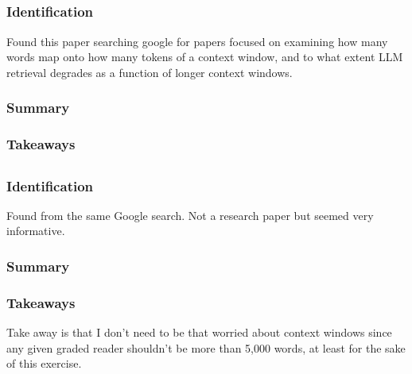\documentclass[
	letterpaper, %
]{jdf}
\begin{document}
\subsection{}
\subsubsection{Identification}
Found this paper searching google for papers focused on examining how many words map onto how many tokens of a context window, and to what extent LLM retrieval degrades as a function of longer context windows.

\subsubsection{Summary}

\subsubsection{Takeaways}

\subsection{}
\subsubsection{Identification}
Found from the same Google search. Not a research paper but seemed very informative.

\subsubsection{Summary}

\subsubsection{Takeaways}
Take away is that I don't need to be that worried about context windows since any given graded reader shouldn't be more than 5,000 words, at least for the sake of this exercise.
\end{document}
